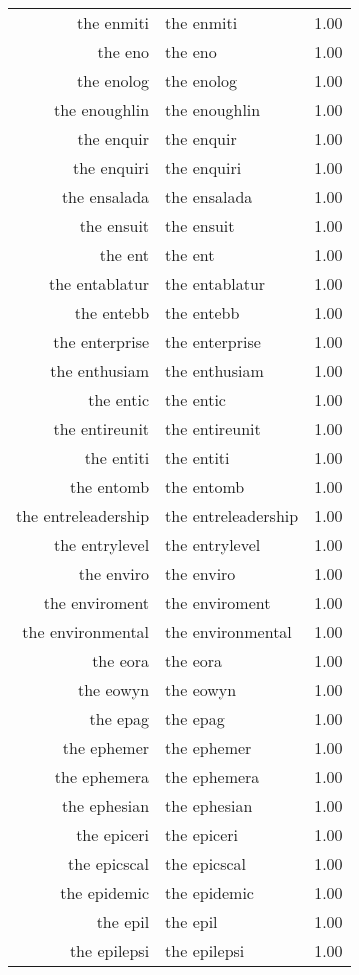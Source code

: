 \begin{table}[ht]
\begin{tabular}{rlr}
  the enmiti & the enmiti & 1.00 \\ 
  the eno & the eno & 1.00 \\ 
  the enolog & the enolog & 1.00 \\ 
  the enoughlin & the enoughlin & 1.00 \\ 
  the enquir & the enquir & 1.00 \\ 
  the enquiri & the enquiri & 1.00 \\ 
  the ensalada & the ensalada & 1.00 \\ 
  the ensuit & the ensuit & 1.00 \\ 
  the ent & the ent & 1.00 \\ 
  the entablatur & the entablatur & 1.00 \\ 
  the entebb & the entebb & 1.00 \\ 
  the enterprise & the enterprise & 1.00 \\ 
  the enthusiam & the enthusiam & 1.00 \\ 
  the entic & the entic & 1.00 \\ 
  the entireunit & the entireunit & 1.00 \\ 
  the entiti & the entiti & 1.00 \\ 
  the entomb & the entomb & 1.00 \\ 
  the entreleadership & the entreleadership & 1.00 \\ 
  the entrylevel & the entrylevel & 1.00 \\ 
  the enviro & the enviro & 1.00 \\ 
  the enviroment & the enviroment & 1.00 \\ 
  the environmental & the environmental & 1.00 \\ 
  the eora & the eora & 1.00 \\ 
  the eowyn & the eowyn & 1.00 \\ 
  the epag & the epag & 1.00 \\ 
  the ephemer & the ephemer & 1.00 \\ 
  the ephemera & the ephemera & 1.00 \\ 
  the ephesian & the ephesian & 1.00 \\ 
  the epiceri & the epiceri & 1.00 \\ 
  the epicscal & the epicscal & 1.00 \\ 
  the epidemic & the epidemic & 1.00 \\ 
  the epil & the epil & 1.00 \\ 
  the epilepsi & the epilepsi & 1.00 \\ 

\end{tabular}
\end{table}
